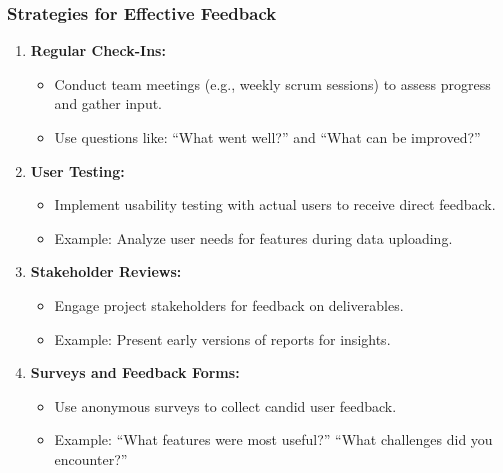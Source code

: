 \documentclass{beamer}
\begin{document}
\begin{frame}[fragile]
    \frametitle{Strategies for Effective Feedback}
    \begin{enumerate}
        \item \textbf{Regular Check-Ins:}
        \begin{itemize}
            \item Conduct team meetings (e.g., weekly scrum sessions) to assess progress and gather input.
            \item Use questions like: ``What went well?'' and ``What can be improved?''
        \end{itemize}

        \item \textbf{User Testing:}
        \begin{itemize}
            \item Implement usability testing with actual users to receive direct feedback.
            \item Example: Analyze user needs for features during data uploading.
        \end{itemize}

        \item \textbf{Stakeholder Reviews:}
        \begin{itemize}
            \item Engage project stakeholders for feedback on deliverables.
            \item Example: Present early versions of reports for insights.
        \end{itemize}

        \item \textbf{Surveys and Feedback Forms:}
        \begin{itemize}
            \item Use anonymous surveys to collect candid user feedback.
            \item Example: ``What features were most useful?'' ``What challenges did you encounter?''
        \end{itemize}
    \end{enumerate}
\end{frame}
\end{document}
